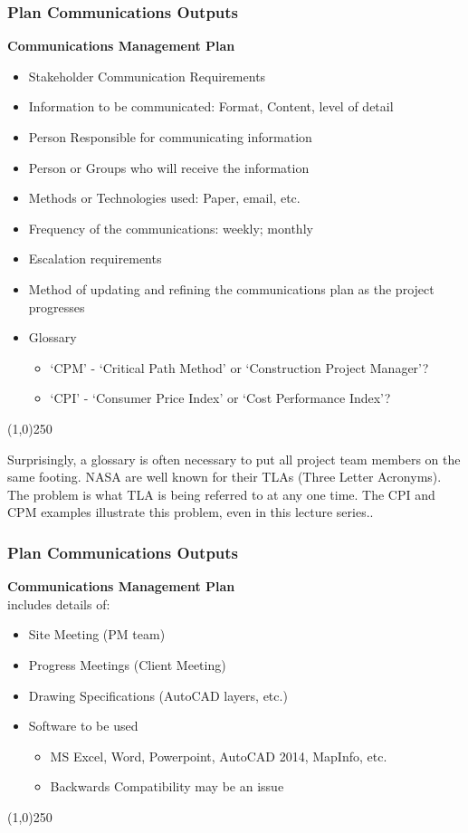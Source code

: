 \begin{frame}
\frametitle{Plan Communications \hfill\hfill Outputs}
\textbf{Communications Management Plan}
\begin{itemize}
	\item Stakeholder Communication Requirements
	\item Information to be communicated: Format, Content, level of detail
	\item Person Responsible for communicating information
	\item Person or Groups who will receive the information
	\item Methods or Technologies used: Paper, email, etc.
	\item Frequency of the communications: weekly; monthly
	\item Escalation requirements
	\item Method of updating and refining the communications plan as the project progresses
	\item Glossary 
	\begin{itemize}
		\item `CPM' - `Critical Path Method' or `Construction Project Manager'?
		\item `CPI' - `Consumer Price Index' or `Cost Performance Index'?
	\end{itemize}
\end{itemize}
\end{frame}\begin{center}\line(1,0){250}\end{center}

Surprisingly, a glossary is often necessary to put all project team members on the same footing.  NASA are well known for their TLAs (Three Letter Acronyms).  The problem is what TLA is being referred to at any one time.  The CPI and CPM examples illustrate this problem, even in this lecture series..


\begin{frame}
\frametitle{Plan Communications \hfill\hfill Outputs}
\textbf{Communications Management Plan}\\
includes details of: 
\begin{itemize}
	\item Site Meeting (PM team)
	\item Progress Meetings (Client Meeting)
	\item Drawing Specifications (AutoCAD layers, etc.)
	\item Software to be used
		\begin{itemize}
			\item MS Excel, Word, Powerpoint, AutoCAD 2014, MapInfo, etc.
			\item Backwards Compatibility may be an issue
		\end{itemize}
\end{itemize}
\end{frame}\begin{center}\line(1,0){250}\end{center}




